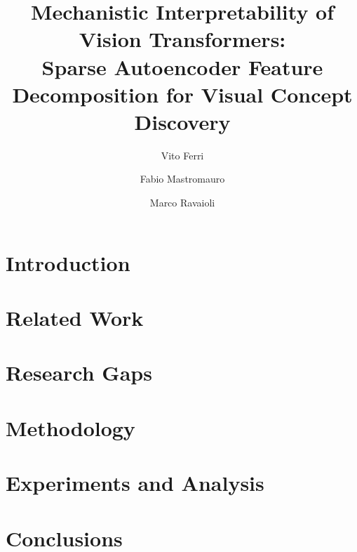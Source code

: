 \documentclass[sigconf, nonacm]{acmart}
\begin{document}
\title{Mechanistic Interpretability of Vision Transformers:\\
Sparse Autoencoder Feature Decomposition for Visual Concept Discovery}

\author{Vito Ferri}

\author{Fabio Mastromauro}

\author{Marco Ravaioli}

\begin{abstract}

\end{abstract}


\maketitle

\section{Introduction}


\section{Related Work}


\section{Research Gaps}


\section{Methodology}


\section{Experiments and Analysis}


\section{Conclusions}




\end{document}
